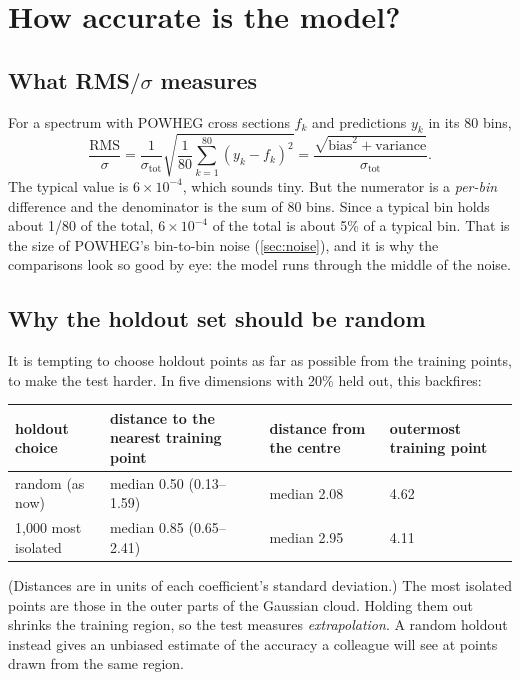 \documentclass[11pt]{article}
\begin{document}
\section{How accurate is the model?}
\label{sec:accuracy}

\subsection{What RMS$/\sigma$ measures}

For a spectrum with POWHEG cross sections $f_k$ and predictions $y_k$ in its 80 bins,
\[
  \frac{\text{RMS}}{\sigma} = \frac{1}{\sigma_\text{tot}} \sqrt{\frac{1}{80}\sum_{k=1}^{80} (y_k - f_k)^2}
  = \frac{\sqrt{\text{bias}^2 + \text{variance}}}{\sigma_\text{tot}} .
\]
The typical value is $6 \times 10^{-4}$, which sounds tiny. But the numerator is a
\emph{per-bin} difference and the denominator is the sum of 80 bins. Since a typical
bin holds about 1/80 of the total, $6\times10^{-4}$ of the total is about 5\% of a
typical bin. That is the size of POWHEG's bin-to-bin noise (\cref{sec:noise}), and it
is why the comparisons look so good by eye: the model runs through the middle of the
noise.

\subsection{Why the holdout set should be random}

It is tempting to choose holdout points as far as possible from the training points,
to make the test harder. In five dimensions with 20\% held out, this backfires:

\begin{center}
\small
\begin{tabular}{lp{}p{}p{}}
\toprule
holdout choice & distance to the nearest training point & distance from the centre & outermost training point\\
\midrule
random (as now) & median 0.50 (0.13--1.59) & median 2.08 & 4.62\\
1,000 most isolated & median 0.85 (0.65--2.41) & median 2.95 & 4.11\\
\bottomrule
\end{tabular}
\end{center}

(Distances are in units of each coefficient's standard deviation.) The most isolated
points are those in the outer parts of the Gaussian cloud. Holding them out shrinks
the training region, so the test measures \emph{extrapolation}. A random holdout
instead gives an unbiased estimate of the accuracy a colleague will see at points
drawn from the same region.
\end{document}

